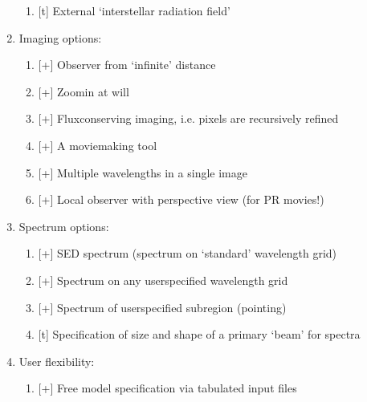 \documentclass[letterpaper,10pt,english]{sphinxmanual}
\begin{document}
\begin{enumerate}
\begin{enumerate}
\item {} 
{[}t{]} External ‘interstellar radiation field’

\end{enumerate}

\item {} 
Imaging options:
\begin{enumerate}
%
\item {} 
{[}+{]} Observer from ‘infinite’ distance

\item {} 
{[}+{]} Zoom\sphinxhyphen{}in at will

\item {} 
{[}+{]} Flux\sphinxhyphen{}conserving imaging, i.e. pixels are recursively refined

\item {} 
{[}+{]} A movie\sphinxhyphen{}making tool

\item {} 
{[}+{]} Multiple wavelengths in a single image

\item {} 
{[}+{]} Local observer with perspective view (for PR movies!)

\end{enumerate}

\item {} 
Spectrum options:
\begin{enumerate}
%
\item {} 
{[}+{]} SED spectrum (spectrum on ‘standard’ wavelength grid)

\item {} 
{[}+{]} Spectrum on any user\sphinxhyphen{}specified wavelength grid

\item {} 
{[}+{]} Spectrum of user\sphinxhyphen{}specified sub\sphinxhyphen{}region (pointing)

\item {} 
{[}t{]} Specification of size and shape of a primary ‘beam’ for spectra

\end{enumerate}

\item {} 
User flexibility:
\begin{enumerate}
%
\item {} 
{[}+{]} Free model specification via tabulated input files


\end{enumerate}
\end{enumerate}
\end{document}
